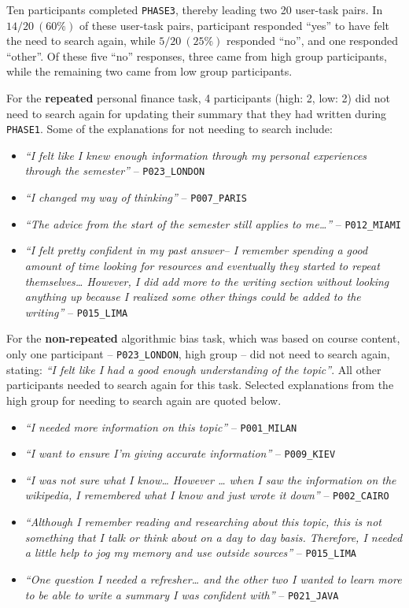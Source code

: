 \documentclass[letterpaper, nobind]{templates/ociamthesis}
\providecommand{\tightlist}{%
  \setlength{\itemsep}{0pt}\setlength{\parskip}{0pt}}
\begin{document}
Ten participants completed \texttt{PHASE3}, thereby leading two 20 user-task pairs.
In \(14 / 20 ~ (60\%)\) of these user-task pairs, participant responded ``yes'' to have felt the need to search again, while \(5 / 20 ~ (25\%)\) responded ``no'', and one responded ``other''.
Of these five ``no'' responses, three came from high group participants, while the remaining two came from low group participants.

For the \textbf{repeated} personal finance task, 4 participants (high: 2, low: 2) did not need to search again for updating their summary that they had written during \texttt{PHASE1}.
Some of the explanations for not needing to search include:

\begin{itemize}
\tightlist
\item
  \emph{``I felt like I knew enough information through my personal experiences through the semester''} -- \texttt{P023\_LONDON}
\item
  \emph{``I changed my way of thinking''} -- \texttt{P007\_PARIS}
\item
  \emph{``The advice from the start of the semester still applies to me\ldots{}''} -- \texttt{P012\_MIAMI}
\item
  \emph{``I felt pretty confident in my past answer-- I remember spending a good amount of time looking for resources and eventually they started to repeat themselves\ldots{} However, I did add more to the writing section without looking anything up because I realized some other things could be added to the writing''} -- \texttt{P015\_LIMA}
\end{itemize}

For the \textbf{non-repeated} algorithmic bias task, which was based on course content, only one participant -- \texttt{P023\_LONDON}, high group -- did not need to search again, stating: \emph{``I felt like I had a good enough understanding of the topic''}.
All other participants needed to search again for this task.
Selected explanations from the high group for needing to search again are quoted below.

\begin{itemize}
\tightlist
\item
  \emph{``I needed more information on this topic''} -- \texttt{P001\_MILAN}
\item
  \emph{``I want to ensure I'm giving accurate information''} -- \texttt{P009\_KIEV}
\item
  \emph{``I was not sure what I know\ldots{} However \ldots{} when I saw the information on the wikipedia, I remembered what I know and just wrote it down''} -- \texttt{P002\_CAIRO}
\item
  \emph{``Although I remember reading and researching about this topic, this is not something that I talk or think about on a day to day basis. Therefore, I needed a little help to jog my memory and use outside sources''} -- \texttt{P015\_LIMA}
\item
  \emph{``One question I needed a refresher\ldots{} and the other two I wanted to learn more to be able to write a summary I was confident with''} -- \texttt{P021\_JAVA}
\end{itemize}
\end{document}
